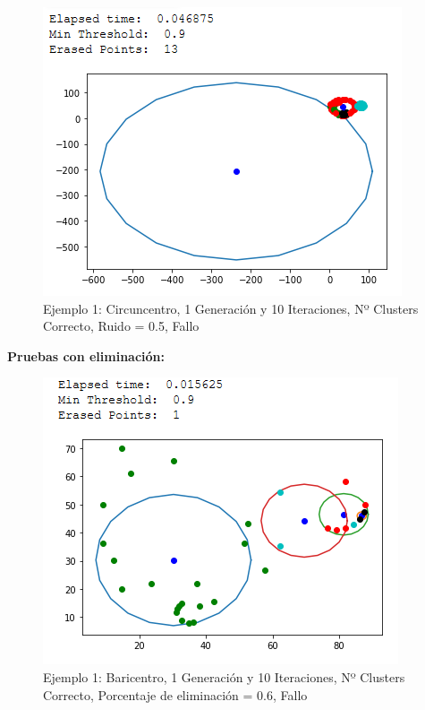 \documentclass[conference,a4paper]{IEEEtran}
\begin{document}
\begin{figure}[H]
\centering
\includegraphics[scale=0.65]{Experimentacion/Ejemplo1/ej1_c_1_10_lr_wrong}
\caption{Ejemplo 1: Circuncentro, 1 Generación y 10 Iteraciones,  Nº Clusters Correcto, Ruido = 0.5, Fallo\\}
\end{figure}

\textbf{Pruebas con eliminación:}\\

\begin{figure}[H]
\centering
\includegraphics[scale=0.65]{Experimentacion/Ejemplo1/ej1_b_1_10_me}
\caption{Ejemplo 1: Baricentro, 1 Generación y 10 Iteraciones,  Nº Clusters Correcto, Porcentaje de eliminación = 0.6, Fallo\\}
\end{figure}
\end{document}
